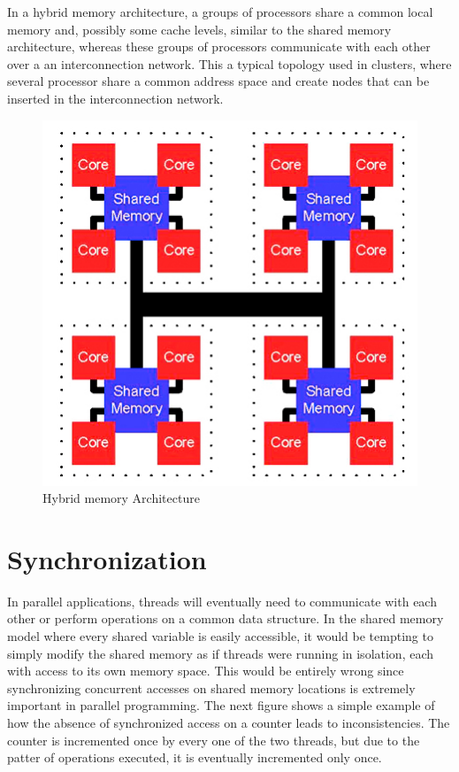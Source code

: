 In a hybrid memory architecture, a groups of processors share a common local memory and, possibly some cache levels, similar to the shared memory architecture, whereas these groups of processors communicate with each other over a  an interconnection network. This a typical topology used in clusters, where several processor share a common address space and create nodes that can be inserted in the interconnection network.

\begin{figure}
 \centering
  \includegraphics[scale=1.5]{hybrid_memory.jpg}
\caption{Hybrid memory Architecture}
\label{Hybrid memory architecture}
\end{figure}


\section{Synchronization}

In parallel applications, threads will eventually need to communicate with each other or perform operations on a common data structure. In the shared memory model where every shared variable is easily accessible, it would be tempting to simply modify the shared memory as if threads were running in isolation, each with access to its own memory space. This would be entirely wrong since synchronizing concurrent accesses on shared memory locations is extremely important in parallel programming. The next figure shows a simple example of how the absence of synchronized access on a counter leads to inconsistencies. The counter is incremented once by every one of the two threads, but due to the patter of operations executed, it is eventually incremented only once.

